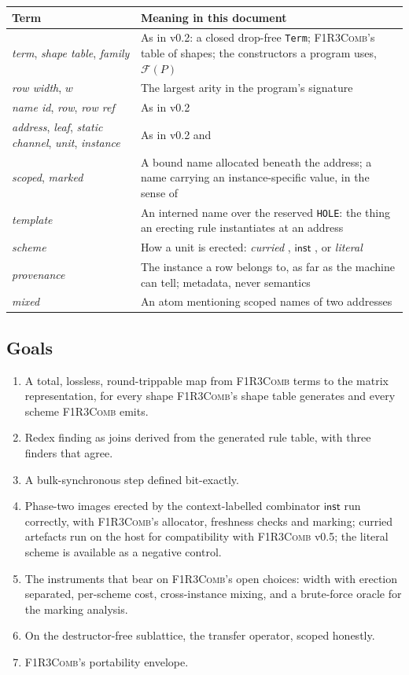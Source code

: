 \documentclass[11pt,a4paper]{article}
\newcommand{\code}[1]{\texttt{#1}}
\newcommand{\Comb}{\textsc{F1R3Comb}}
\theoremstyle{definition}
\theoremstyle{plain}
\newcommand{\inst}{\mathsf{inst}}
\newcommand{\Fam}{\mathcal{F}}
\begin{document}
\begin{center}
\begin{tabularx}{\linewidth}{@{}l>{\raggedright\arraybackslash}X@{}}
\toprule
Term & Meaning in this document\\
\midrule
\emph{term}, \emph{shape table}, \emph{family} & As in v0.2: a closed
drop-free \code{Term}; \Comb's table of shapes; the constructors a program
uses, $\Fam(P)$\\
\emph{row width}, $w$ & The largest arity in the program's signature\\
\emph{name id}, \emph{row}, \emph{row ref} & As in v0.2\\
\emph{address}, \emph{leaf}, \emph{static channel}, \emph{unit},
\emph{instance} & As in v0.2 and \cite[\S1.3]{combspec}\\
\emph{scoped}, \emph{marked} & A bound name allocated beneath the address; a
name carrying an instance-specific value, in the sense of
\cite[Rem.~6.20]{draft3}\\
\emph{template} & An interned name over the reserved \code{HOLE}: the thing
an erecting rule instantiates at an address\\
\emph{scheme} & How a unit is erected: \emph{curried}
\cite[\S6.7]{draft3}, \emph{$\inst$} \cite[\S6.7]{draft3}, or \emph{literal}
\cite[Def.~6.8]{draft3}\\
\emph{provenance} & The instance a row belongs to, as far as the machine can
tell; metadata, never semantics\\
\emph{mixed} & An atom mentioning scoped names of two addresses\\
\bottomrule
\end{tabularx}
\end{center}

\subsection{Goals}

\begin{enumerate}[leftmargin=1.6em]
\item A total, lossless, round-trippable map from \Comb{} terms to the matrix
representation, for every shape \Comb's shape table generates and every
scheme \Comb{} emits.
\item Redex finding as joins derived from the generated rule table, with three
finders that agree.
\item A bulk-synchronous step defined bit-exactly.
\item Phase-two images erected by the context-labelled combinator $\inst$
run correctly, with \Comb's allocator, freshness checks and marking; curried
artefacts run on the host for compatibility with \Comb{} v0.5; the literal
scheme is available as a negative control.
\item The instruments that bear on \Comb's open choices: width with erection
separated, per-scheme cost, cross-instance mixing, and a brute-force oracle
for the marking analysis.
\item On the destructor-free sublattice, the transfer operator, scoped
honestly.
\item \Comb's portability envelope.
\end{enumerate}
\end{document}

